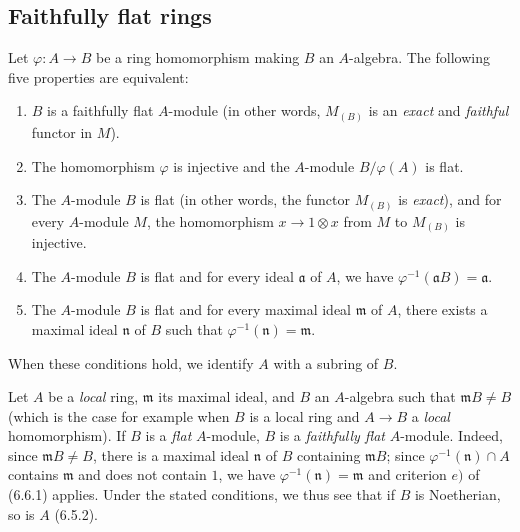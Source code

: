 \subsection{Faithfully flat rings}
\label{subsection:0.6.6}

\begin{env}[6.6.1]
\label{0.6.6.1}
Let $\varphi:A\to B$ be a ring homomorphism making $B$ an
$A$-algebra. The following five properties are equivalent:
\begin{enumerate}
  \item[$a)$] $B$ is a faithfully flat $A$-module (in other words,
    $M_{(B)}$ is an \emph{exact} and \emph{faithful} functor in $M$).
  \item[$b)$] The homomorphism $\varphi$ is injective and the $A$-module
    $B/\varphi(A)$ is flat.


  \item[$c)$] The $A$-module $B$ is flat (in other words, the functor
    $M_{(B)}$ is \emph{exact}), and for every $A$-module $M$, the homomorphism
    $x\to1\otimes x$ from $M$ to $M_{(B)}$ is injective.
  \item[$d)$] The $A$-module $B$ is flat and for every ideal $\mathfrak a$ of
    $A$, we have $\varphi^{-1}(\mathfrak aB)=\mathfrak a$.
  \item[$e)$] The $A$-module $B$ is flat and for every maximal ideal
    $\mathfrak m$ of $A$, there exists a maximal ideal $\mathfrak n$ of $B$ such
    that $\varphi^{-1}(\mathfrak n)=\mathfrak m$.
\end{enumerate}

When these conditions hold, we identify $A$ with a subring of $B$.
\end{env}

\begin{env}[6.6.2]
\label{0.6.6.2}
Let $A$ be a \emph{local} ring, $\mathfrak m$ its maximal ideal, and $B$ an
$A$-algebra such that $\mathfrak mB\neq B$ (which is the case for example when
$B$ is a local ring and $A\to B$ a \emph{local} homomorphism). If $B$ is a
\emph{flat} $A$-module, $B$ is a \emph{faithfully flat} $A$-module. Indeed, since
$\mathfrak mB\neq B$, there is a maximal ideal $\mathfrak n$ of $B$ containing
$\mathfrak mB$; since $\varphi^{-1}(\mathfrak n)\cap A$ contains
$\mathfrak m$ and does not contain $1$, we have
$\varphi^{-1}(\mathfrak n)=\mathfrak m$ and criterion $e)$ of (6.6.1)
applies. Under the stated conditions, we thus see that if $B$ is
Noetherian, so is $A$ (6.5.2).
\end{env}

